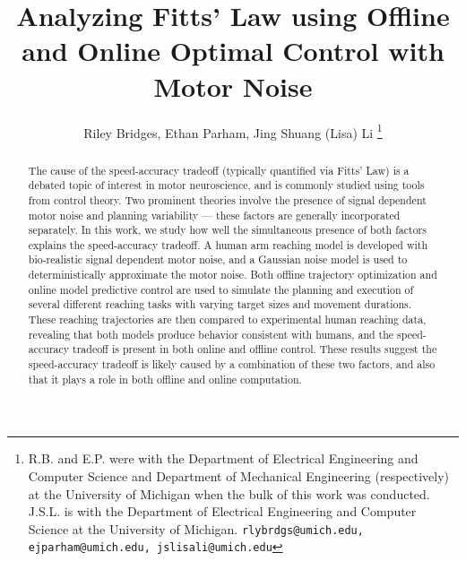 \documentclass[letterpaper, 10pt, conference]{ieeeconf}
\title{\LARGE \bf Analyzing Fitts' Law using Offline and Online Optimal Control with Motor Noise}
\author{Riley Bridges, Ethan Parham, Jing Shuang (Lisa) Li 
\thanks{R.B. and E.P. were with the Department of Electrical Engineering and Computer Science and Department of Mechanical Engineering (respectively) at the University of Michigan when the bulk of this work was conducted. J.S.L. is with the Department of Electrical Engineering and Computer Science at the University of Michigan. {\tt\small rlybrdgs@umich.edu, ejparham@umich.edu, jslisali@umich.edu}}
}
\begin{document}
\maketitle
\thispagestyle{plain}
\pagestyle{plain}

\begin{abstract}
The cause of the speed-accuracy tradeoff (typically quantified via Fitts' Law) is a debated topic of interest in motor neuroscience, and is commonly studied using tools from control theory. Two prominent theories involve the presence of signal dependent motor noise and planning variability --- these factors are generally incorporated separately. In this work, we study how well the simultaneous presence of both factors explains the speed-accuracy tradeoff. A human arm reaching model is developed with bio-realistic signal dependent motor noise, and a Gaussian noise model is used to deterministically approximate the motor noise. Both offline trajectory optimization and online model predictive control are used to simulate the planning and execution of several different reaching tasks with varying target sizes and movement durations. These reaching trajectories are then compared to experimental human reaching data, revealing that both models produce behavior consistent with humans, and the speed-accuracy tradeoff is present in both online and offline control. These results suggest the speed-accuracy tradeoff is likely caused by a combination of these two factors, and also that it plays a role in both offline and online computation.
\end{abstract}
\end{document}
